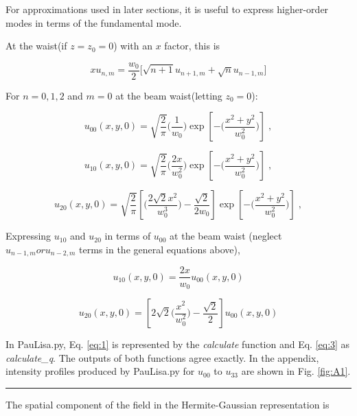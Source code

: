 \documentclass[aps,twoside,secnumarabic,balancelastpage,amsmath,amssymb,nofootinbib,hyperref=pdftex]{revtex4}
\newcommand{\bigfrac}[2]{\Big( \frac{#1}{#2}\Big)}
\begin{document}
For approximations used in later sections, it is useful to express higher-order modes in terms of the fundamental mode. 

At the waist(if $z=z_0=0$) with an $x$ factor, this is

\begin{equation}
x u_{n,m} = \frac{w_0}{2}
\Big[
	\sqrt{n+1} u_{n+1,m}
	+
	\sqrt{n}
	u_{n-1,m}
\Big]
\end{equation}

For $n=0,1,2$ and $m=0$ at the beam waist(letting $z_{0}=0$):

\begin{equation}\label{eq:4}
u_{00}(x,y,0)= \sqrt{\frac{2}{\pi}}
\bigfrac{1}{w_{0}}
\exp \left[ - \bigfrac{x^{2}+y^{2}}{w_{0}^{2}} \right] \; ,
\end{equation}

\begin{equation}\label{eq:5}
u_{10}(x,y,0)= \sqrt{\frac{2}{\pi}}
\bigfrac{2x}{w_{0}^{2}}
\exp \left[ - \bigfrac{x^{2}+y^{2}}{w_{0}^{2}} \right] \; ,
\end{equation}

\begin{equation}\label{eq:6}
u_{20}(x,y,0)= \sqrt{\frac{2}{\pi}}
\left[ \bigfrac{2 \sqrt{2}x^{2}}{w_{0}^{3}}- \frac{\sqrt{2}}{2 w_0} \right]
\exp \left[ - \bigfrac{x^{2}+y^{2}}{w_{0}^{2}} \right] \; ,
\end{equation}

Expressing $u_{10}$ and $u_{20}$ in terms of $u_{00}$ at the beam waist (neglect $u_{n-1,m} or u_{n-2,m}$ terms in the general equations above),

	\begin{equation}\label{eq:7}
		u_{10}(x,y,0)= \frac{2x}{w_{0}} u_{00}(x,y,0)
	\end{equation}	
	
	\begin{equation}\label{eq:8}
		u_{20}(x,y,0)= \left[2 \sqrt{2} \bigfrac{x^{2}}{w_{0}^{2}}- \frac{\sqrt{2}}{2} \right] u_{00}(x,y,0)
	\end{equation}	
	
	In PauLisa.py, Eq. \ref{eq:1} is represented by the \textit{calculate} function and Eq. \ref{eq:3} as \textit{calculate\_q}. The outputs of both functions agree exactly. In the appendix, intensity profiles produced by PauLisa.py for $u_{00}$ to $u_{33}$ are shown in Fig. \ref{fig:A1}.	

\rule{\textwidth}{0.4pt}

The spatial component of the field in the Hermite-Gaussian representation is
\end{document}
